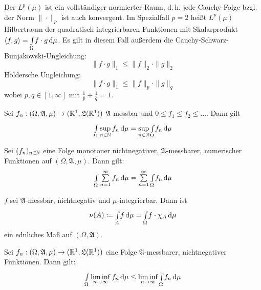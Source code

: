 \documentclass{cheat-sheet}
\newcommand{\Alg}{\mathfrak{A}}
\newcommand{\LebAlg}{\mathfrak{L}} %
\begin{document}

\begin{bem}
  Der $L^p(\mu)$ ist ein vollständiger normierter Raum, d.\,h. jede Cauchy-Folge bzgl. der Norm $\| \cdot \|_p$ ist auch konvergent. Im Spezialfall $p = 2$ heißt $L^p(\mu)$ Hilbertraum der quadratisch integrierbaren Funktionen mit Skalarprodukt $\langle f , g \rangle = {\textstyle \int\limits_{\Omega}^{}} f \cdot g \,\mathrm{d} \mu$. Es gilt in diesem Fall außerdem die Cauchy-Schwarz-Bunjakowski-Ungleichung:
  \[ \| f \cdot g \|_{1} \leq \|f\|_2 \cdot \|g\|_2 \]
  Höldersche Ungleichung:
  \[ \| f \cdot g \|_{1} \leq \|f\|_p \cdot \|g\|_q \]
  wobei $p, q \in [1, \infty]$ mit $\tfrac{1}{p} + \tfrac{1}{q} = 1$.
\end{bem}



\begin{satz}
  Sei $f_n : (\Omega, \Alg, \mu) \to (\R^1, \LebAlg(\R^1))$ $\Alg$-messbar und $0 \leq f_1 \leq f_2 \leq ...$. Dann gilt
  \[ {\textstyle \int\limits_{\Omega}^{}} \sup_{n \in \mathbb{N}} f_n \,\mathrm{d} \mu = \sup_{n \in \mathbb{N}} {\textstyle \int\limits_{\Omega}^{}} f_n \,\mathrm{d} \mu \]
\end{satz}

\begin{satz}
  Sei $(f_n)_{n \in \mathbb{N}}$ eine Folge monotoner nichtnegativer, $\Alg$-messbarer, numerischer Funktionen auf $(\Omega, \Alg, \mu)$. Dann gilt:
  \[ \Int{\Omega}{}{\sum_{n=1}^{\infty} f_n}{\mu} = \sum_{n=1}^\infty \Int{\Omega}{}{f_n}{\mu} \]
\end{satz}

\begin{satz}
  $f$ sei $\Alg$-messbar, nichtnegativ und $\mu$-integrierbar. Dann ist
  \[ \nu(A) \coloneqq {\textstyle \int\limits_{A}^{}} f \,\mathrm{d} \mu = {\textstyle \int\limits_{\Omega}^{}} f \cdot \chi_A \,\mathrm{d} \mu \]
  ein ednliches Maß auf $(\Omega, \Alg)$.
\end{satz}

\begin{satz}
  Sei $f_n : (\Omega, \Alg, \mu) \to (\R^1, \LebAlg(\R^1))$ eine Folge $\Alg$-messbarer, nichtnegativer Funktionen. Dann gilt:
  \[ {\textstyle \int\limits_{\Omega}^{}} \liminf_{n \to \infty} f_n \,\mathrm{d} \mu \leq \liminf_{n \to \infty} {\textstyle \int\limits_{\Omega}^{}} f_n \,\mathrm{d} \mu \]
\end{satz}
\end{document}
